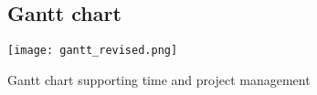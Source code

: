\begin{landscape} \chapter{Gantt chart}
	\label{appendix:gantt_chart}
	\bigskip
	\texttt{[image: gantt\_revised.png]}
	\captionsetup{type=figure}\caption{Gantt chart supporting time and project management}
\end{landscape}